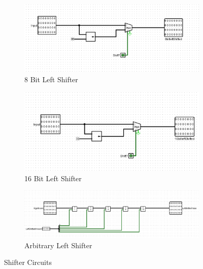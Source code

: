 \documentclass{article}
\begin{document}
\begin{figure}[H]
    \vspace{1em} %

    \begin{subfigure}[b]{0.3\textwidth}
        \includegraphics[width=\textwidth]{8bitleftshifter.png} %
        \caption{8 Bit Left Shifter}
        \label{fig:8bit}
    \end{subfigure}
    \hfill
    \begin{subfigure}[b]{0.3\textwidth}
        \includegraphics[width=\textwidth]{16bitleftshifter.png} %
        \caption{16 Bit Left Shifter}
        \label{fig:16bit}
    \end{subfigure}
    \hfill
    \begin{subfigure}[b]{0.3\textwidth}
        \includegraphics[width=\textwidth]{arbitaryleftshifter.png} %
        \caption{Arbitrary Left Shifter}
        \label{fig:arb}
    \end{subfigure}
    
    \caption{Shifter Circuits}
    \label{fig:Shifter Circuits}
\end{figure}
\end{document}
